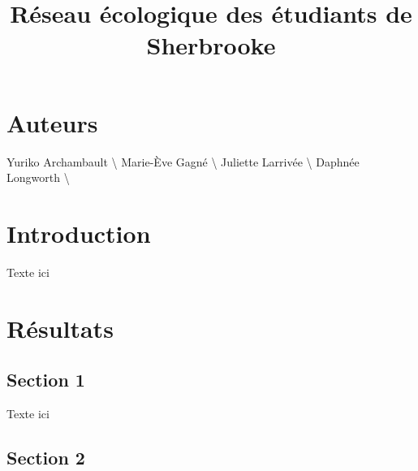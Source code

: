 \documentclass[9pt,twocolumn,twoside,]{pnas-new}
\title{Réseau écologique des étudiants de Sherbrooke}
\begin{document}
\verticaladjustment{-2pt}



\maketitle
\thispagestyle{firststyle}


\acknow{}

\section*{Auteurs}

Yuriko Archambault \textbackslash{} Marie-Ève Gagné \textbackslash{}
Juliette Larrivée \textbackslash{} Daphnée Longworth \textbackslash{}

\hypertarget{introduction}{%
\section{Introduction}\label{introduction}}

Texte ici

\hypertarget{ruxe9sultats}{%
\section{Résultats}\label{ruxe9sultats}}

\hypertarget{section-1}{%
\subsection{Section 1}\label{section-1}}

Texte ici

\hypertarget{section-2}{%
\subsection{Section 2}\label{section-2}}
\end{document}
